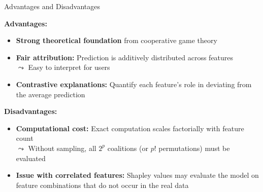 \documentclass[11pt,compress,t,notes=noshow, aspectratio=169, xcolor=table]{beamer}
\begin{document}
\begin{frame}{Advantages and Disadvantages}

\textbf{Advantages:}
\begin{itemize}%
  \item \textbf{Strong theoretical foundation} from cooperative game theory
  \item \textbf{Fair attribution:} Prediction is additively distributed across features\\
  $\leadsto$ Easy to interpret for users
  \item \textbf{Contrastive explanations:} Quantify each feature's role in deviating from the average prediction
\end{itemize}

\vspace{0.3cm}

\textbf{Disadvantages:}
\begin{itemize}%
  \item \textbf{Computational cost:} Exact computation scales factorially with feature count\\
  $\leadsto$  Without sampling, all $2^p$ coalitions (or $p!$ permutations) must be evaluated
  \item \textbf{Issue with correlated features:} Shapley values may evaluate the model on feature combinations that do not occur in the real data
\end{itemize}

\end{frame}


\endlecture
\end{document}
